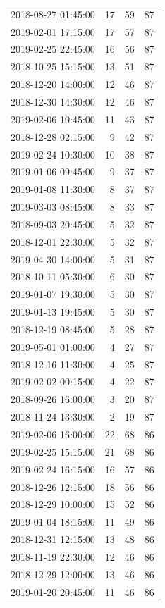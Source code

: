 \begin{tabular}{lrrr}
2018-08-27 01:45:00 & 17 & 59 & 87 \\
2019-02-01 17:15:00 & 17 & 57 & 87 \\
2019-02-25 22:45:00 & 16 & 56 & 87 \\
2018-10-25 15:15:00 & 13 & 51 & 87 \\
2018-12-20 14:00:00 & 12 & 46 & 87 \\
2018-12-30 14:30:00 & 12 & 46 & 87 \\
2019-02-06 10:45:00 & 11 & 43 & 87 \\
2018-12-28 02:15:00 & 9 & 42 & 87 \\
2019-02-24 10:30:00 & 10 & 38 & 87 \\
2019-01-06 09:45:00 & 9 & 37 & 87 \\
2019-01-08 11:30:00 & 8 & 37 & 87 \\
2019-03-03 08:45:00 & 8 & 33 & 87 \\
2018-09-03 20:45:00 & 5 & 32 & 87 \\
2018-12-01 22:30:00 & 5 & 32 & 87 \\
2019-04-30 14:00:00 & 5 & 31 & 87 \\
2018-10-11 05:30:00 & 6 & 30 & 87 \\
2019-01-07 19:30:00 & 5 & 30 & 87 \\
2019-01-13 19:45:00 & 5 & 30 & 87 \\
2018-12-19 08:45:00 & 5 & 28 & 87 \\
2019-05-01 01:00:00 & 4 & 27 & 87 \\
2018-12-16 11:30:00 & 4 & 25 & 87 \\
2019-02-02 00:15:00 & 4 & 22 & 87 \\
2018-09-26 16:00:00 & 3 & 20 & 87 \\
2018-11-24 13:30:00 & 2 & 19 & 87 \\
2019-02-06 16:00:00 & 22 & 68 & 86 \\
2019-02-25 15:15:00 & 21 & 68 & 86 \\
2019-02-24 16:15:00 & 16 & 57 & 86 \\
2018-12-26 12:15:00 & 18 & 56 & 86 \\
2018-12-29 10:00:00 & 15 & 52 & 86 \\
2019-01-04 18:15:00 & 11 & 49 & 86 \\
2018-12-31 12:15:00 & 13 & 48 & 86 \\
2018-11-19 22:30:00 & 12 & 46 & 86 \\
2018-12-29 12:00:00 & 13 & 46 & 86 \\
2019-01-20 20:45:00 & 11 & 46 & 86 \\

\end{tabular}
